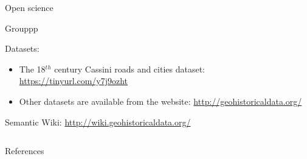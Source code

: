 \documentclass[final,hyperref={pdfpagelabels=false}]{beamer}
\begin{document}
\begin{frame}
\begin{columns}
\begin{column}{0.394\textwidth}
\begin{block}{Open science}
\begin{Mdescription}{Grouppp}
            \item[\textcolor{ta3orange}{Datasets:}]
              \begin{itemize}\scriptsize
              \item The 18$^{th}$ century Cassini roads and cities dataset: \url{https://tinyurl.com/y7j9ozht}%
              \item Other datasets are available from the website: \url{http://geohistoricaldata.org/}
              \end{itemize}
            \item[\textcolor{ta3orange}{Semantic Wiki:}] \url{http://wiki.geohistoricaldata.org/}
            \end{Mdescription}
          \end{block}
    \end{column}
  \end{columns}
  
  \begin{block}{References}
    \vspace*{-1.5em}
	\begin{multicols}{2}
		\tiny
		
		
	\end{multicols}
  \end{block}
\end{frame}
\end{document}
